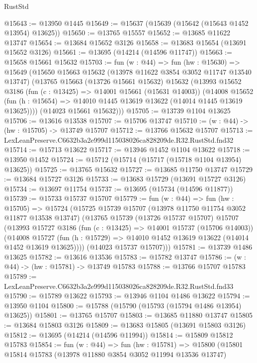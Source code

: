 \begin{lexlean}{RustStd}
\begin{coremodule}
@15643 := @13950 @1445
@15649 := @15637 (@15639 (@15642 (@15643 @1452 @13954) @13625))
@15650 := @13765 @15557
@15652 := @13685 @11622 @13747
@15654 := @13684 @15652 @3126
@15658 := @13683 @15654 (@13691 @15652 @3126)
@15661 := @13695 (@14214 (@14596 @11747))
@15663 := @15658 @15661 @15632
@15703 := fun (w : @44) =>
  fun (hw : @15630) =>
  @15649
    (@15650
      @15663
      @15632
      (@13978 @11622 @3854 @3052 @11747 @13540 @13747)
      (@13765
        @15663
        (@13726 @15661 @15632)
        @15632
        (@13993
          @15652
          @3186
          (fun (c : @13425) => @14001 @15661 (@15631 @14003))
          (@14008
            @15652
            (fun (h : @15654) => @14010 @1445 @13619 @13622 (@14014 @1445 @13619 @13625))))
        (@14023 @15661 @15632)))
@15705 := @13739 @1104 @13625
@15706 := @13616 @13538
@15707 := @15706 @13747
@15710 := (w : @44) -> (hw : @15705) -> @13749 @15707
@15712 := @13766 @15632 @15707
@15713 := LexLeanPreserve.C6632b3a2e999d115038026ca828209de.R32.RustStd.fnd32
@15714 := @15713 @13622
@15717 := @13946 @1452 @1104 @13622
@15718 := @13950 @1452
@15724 := @15712 (@15714 (@15717 (@15718 @1104 @13954) @13625))
@15725 := @13765 @15632
@15727 := @13685 @11750 @13747
@15729 := @13684 @15727 @3126
@15733 := @13683 @15729 (@13691 @15727 @3126)
@15734 := @13697 @11754
@15737 := @13695 (@15734 (@14596 @11877))
@15739 := @15733 @15737 @15707
@15779 := fun (w : @44) =>
  fun (hw : @15705) =>
  @15724
    (@15725
      @15739
      @15707
      (@13978 @11750 @11754 @3052 @11877 @13538 @13747)
      (@13765
        @15739
        (@13726 @15737 @15707)
        @15707
        (@13993
          @15727
          @3186
          (fun (c : @13425) => @14001 @15737 (@15706 @14003))
          (@14008
            @15727
            (fun (h : @15729) => @14010 @1452 @13619 @13622 (@14014 @1452 @13619 @13625))))
        (@14023 @15737 @15707)))
@15781 := @13739 @1486 @13625
@15782 := @13616 @13536
@15783 := @15782 @13747
@15786 := (w : @44) -> (hw : @15781) -> @13749 @15783
@15788 := @13766 @15707 @15783
@15789 := LexLeanPreserve.C6632b3a2e999d115038026ca828209de.R32.RustStd.fnd33
@15790 := @15789 @13622
@15793 := @13946 @1104 @1486 @13622
@15794 := @13950 @1104
@15800 := @15788 (@15790 (@15793 (@15794 @1486 @13954) @13625))
@15801 := @13765 @15707
@15803 := @13685 @11880 @13747
@15805 := @13684 @15803 @3126
@15809 := @13683 @15805 (@13691 @15803 @3126)
@15812 := @13695 (@14214 (@14596 @11994))
@15814 := @15809 @15812 @15783
@15854 := fun (w : @44) =>
  fun (hw : @15781) =>
  @15800
    (@15801
      @15814
      @15783
      (@13978 @11880 @3854 @3052 @11994 @13536 @13747)

\end{coremodule}
\end{lexlean}
